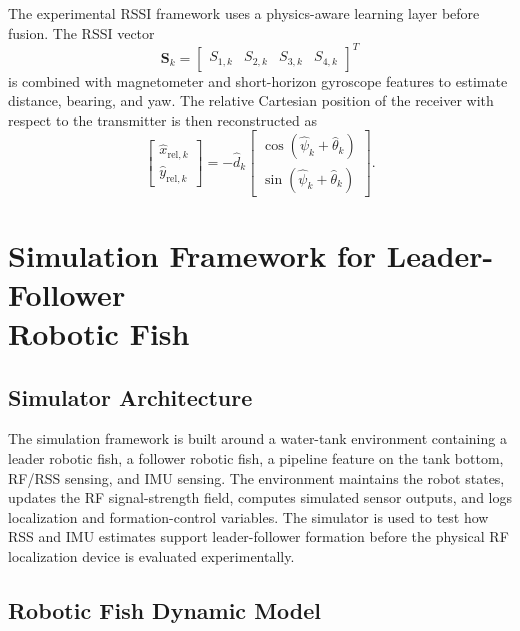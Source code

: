 \documentclass{uhcoethesis}
\begin{document}
The experimental RSSI framework uses a physics-aware learning layer before fusion. The RSSI vector
\begin{equation}
    \mathbf{S}_k =
    \begin{bmatrix}
    S_{1,k} & S_{2,k} & S_{3,k} & S_{4,k}
    \end{bmatrix}^{T}
    \label{eq:ch5_rssi_vector}
\end{equation}
is combined with magnetometer and short-horizon gyroscope features to estimate distance, bearing, and yaw. The relative Cartesian position of the receiver with respect to the transmitter is then reconstructed as
\begin{equation}
    \begin{bmatrix}
    \hat{x}_{\mathrm{rel},k}\\
    \hat{y}_{\mathrm{rel},k}
    \end{bmatrix}
    =
    -\hat{d}_k
    \begin{bmatrix}
    \cos(\hat{\psi}_k+\hat{\theta}_k)\\
    \sin(\hat{\psi}_k+\hat{\theta}_k)
    \end{bmatrix}.
    \label{eq:ch5_relative_position}
\end{equation}

\section[Simulation Framework for Leader-Follower Robotic Fish]{Simulation Framework for Leader-Follower\\ Robotic Fish}

\subsection{Simulator Architecture}

The simulation framework is built around a water-tank environment containing a leader robotic fish, a follower robotic fish, a pipeline feature on the tank bottom, RF/RSS sensing, and IMU sensing. The environment maintains the robot states, updates the RF signal-strength field, computes simulated sensor outputs, and logs localization and formation-control variables. The simulator is used to test how RSS and IMU estimates support leader-follower formation before the physical RF localization device is evaluated experimentally.

\subsection{Robotic Fish Dynamic Model}
\end{document}
